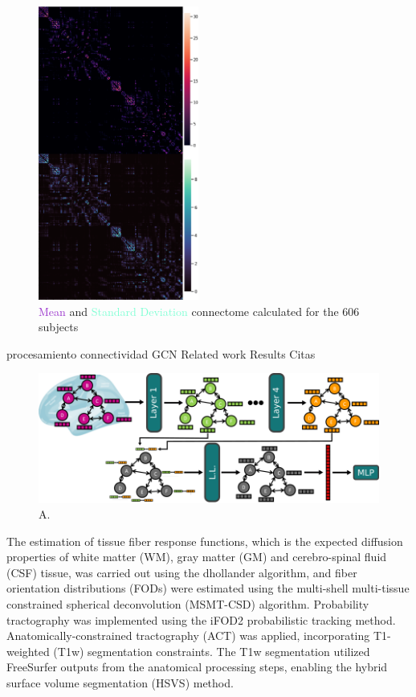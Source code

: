 \documentclass{cys}
\begin{document}
\begin{figure}[H]
\centering
	\includegraphics[width=0.47\textwidth]{SCs200}
	\caption{\textcolor{DarkOrchid}{Mean} and \textcolor{Aquamarine}{Standard Deviation} connectome calculated for the 606 subjects}
	\label{FullBrainTractography}
\end{figure}

procesamiento connectividad
GCN
Related work
Results 
Citas

\begin{figure}[ht]
\centering
	\includegraphics[width=1\textwidth]{GCN}
	\caption{A. }
	\label{CSD}
\end{figure}

The estimation of tissue fiber response functions, which is the expected diffusion properties of white matter (WM), gray matter (GM) and cerebro-spinal fluid (CSF) tissue, was carried out using the dhollander algorithm, and fiber orientation distributions (FODs) were estimated using the multi-shell multi-tissue constrained spherical deconvolution (MSMT-CSD) algorithm. Probability tractography was implemented using the iFOD2 probabilistic tracking method. Anatomically-constrained tractography (ACT) was applied, incorporating T1-weighted (T1w) segmentation constraints. The T1w segmentation utilized FreeSurfer outputs from the anatomical processing steps, enabling the hybrid surface volume segmentation (HSVS) method.
\end{document}
